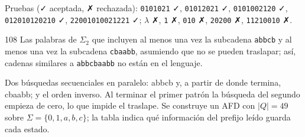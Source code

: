 \documentclass[11pt]{article}
\begin{document}
Pruebas (✓ aceptada, ✗ rechazada): \texttt{0101021} ✓, \texttt{01012021} ✓, \texttt{0101002120} ✓, \texttt{012010120210} ✓, \texttt{22001010021221} ✓; $\lambda$ ✗, \texttt{1} ✗, \texttt{010} ✗, \texttt{20200} ✗, \texttt{11210010} ✗.



\begin{ejercicio}{108}{}
Las palabras de $\Sigma_2$ que incluyen al menos una vez la subcadena \texttt{abbcb} y al menos una vez la subcadena \texttt{cbaabb}, asumiendo que no se pueden traslapar; así, cadenas similares a \texttt{abbcbaabb} no están en el lenguaje.
\end{ejercicio}
\proc Dos búsquedas secuenciales en paralelo: abbcb y, a partir de donde termina, cbaabb; y el orden inverso. Al terminar el primer patrón la búsqueda del segundo empieza de cero, lo que impide el traslape. Se construye un AFD con $|Q| = 49$ sobre $\Sigma = \{0, 1, a, b, c\}$; la tabla indica qué información del prefijo leído guarda cada estado.
\end{document}
